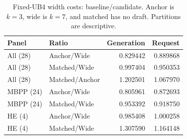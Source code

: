 \begin{table}[t]\centering\small
\caption{Fixed-UB4 width costs: baseline/candidate. Anchor is $k=3$, wide is $k=7$, and matched has no draft. Partitions are descriptive.}\label{tab:fixed_ub}
\begin{tabular}{@{}llrr@{}}\toprule
Panel & Ratio & Generation & Request\\\midrule
All (28) & Anchor/Wide & 0.829442 & 0.889868\\
All (28) & Matched/Wide & 0.997404 & 0.950353\\
All (28) & Matched/Anchor & 1.202501 & 1.067970\\
MBPP (24) & Anchor/Wide & 0.805961 & 0.872693\\
MBPP (24) & Matched/Wide & 0.953392 & 0.918750\\
HE (4) & Anchor/Wide & 0.985408 & 1.000258\\
HE (4) & Matched/Wide & 1.307590 & 1.164148\\
\bottomrule\end{tabular}

\end{table}
